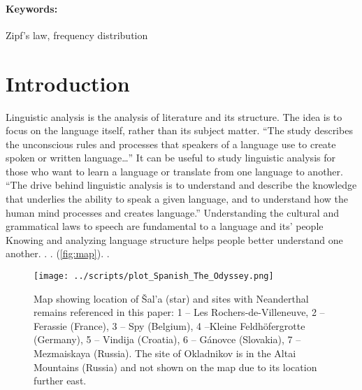 \documentclass[a4paper,10pt]{article}
\begin{document}

\paragraph*{Keywords:} Zipf's law, frequency distribution

\section{Introduction}


Linguistic analysis is the analysis of literature and its structure. The idea is to focus on the language itself, rather than its subject matter. “The study describes the unconscious rules and processes that speakers of a language use to create spoken or written language…” It can be useful to study linguistic analysis for those who want to learn a language or translate from one language to another. “The drive behind linguistic analysis is to understand and describe the knowledge that underlies the ability to speak a given language, and to understand how the human mind processes and creates language.” Understanding the cultural and grammatical laws to speech are fundamental to a language and its’ people Knowing and analyzing language structure helps people better understand one another. \citep[e.g.,][]{Talamo2016,ConardETAL2004-Vogelherd-14C-humans,TrinkausETAL2005,DevieseETAL2017-14C-Vindija, DaviesETAL2015-trans-mosaic,StreetETAL2006-fossil-record}.  \citep[e.g.][]{FuETAL2014-Ust-Ishim,FuETAL2015-Oase}. (\autoref{fig:map}).   \citep[][p.75]{Kaminska2014-Slov-Pal-Meso}. 


\begin{figure}
	\centering
	\texttt{[image: ../scripts/plot\_Spanish\_The\_Odyssey.png]}
	\caption{Map showing location of Šal’a (star) and sites with Neanderthal remains referenced in this paper: 1 -- Les Rochers-de-Villeneuve, 2 -- Ferassie (France), 3 -- Spy (Belgium), 4 --Kleine Feldhöfergrotte (Germany), 5 -- Vindija (Croatia), 6 -- Gánovce (Slovakia), 7 -- Mezmaiskaya (Russia). The site of Okladnikov is in the Altai Mountains (Russia) and not shown on the map due to its location further east.}
	\label{fig:map}
\end{figure}

\end{document}
